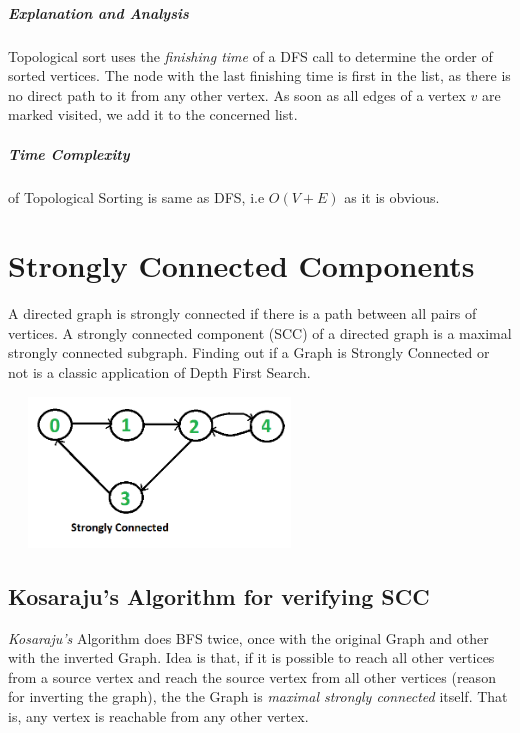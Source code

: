 \documentclass[11pt,a4paper]{extarticle}
\begin{document}
\begin{adjustwidth}{2.5em}{0pt}

\end{adjustwidth}

\subparagraph{Explanation and Analysis}
Topological sort uses the \textit{finishing time} of a DFS call to determine the order of sorted vertices. The node with the last finishing time is first in the list, as there is no direct path to it from any other vertex. As soon as all edges of a vertex $v$ are marked visited, we add it to the concerned list.

\subparagraph{Time Complexity}
of Topological Sorting is same as DFS, i.e $O(V+E)$ as it is obvious.

\section{Strongly Connected Components}
A directed graph is strongly connected if there is a path between all pairs of vertices. A strongly connected component (SCC) of a directed graph is a maximal strongly connected subgraph. Finding out if a Graph is Strongly Connected or not is a classic application of Depth First Search.

\begin{center}
	\includegraphics[width=8cm, height=4cm]{sccexample}
\end{center}

\subsection{Kosaraju's Algorithm for verifying SCC}
\textit{Kosaraju's} Algorithm does BFS twice, once with the original Graph and other with the inverted Graph. Idea is that, if it is possible to reach all other vertices from a source vertex and reach the source vertex from all other vertices (reason for inverting the graph), the the Graph is \textit{maximal strongly connected} itself. That is, any vertex is reachable from any other vertex.

\begin{adjustwidth}{2.5em}{0pt}

\end{adjustwidth}
\end{document}
